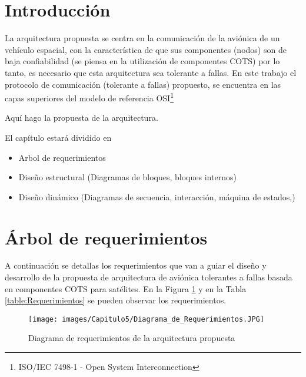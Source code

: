 \section{Introducción}

La arquitectura propuesta se centra en la comunicación de la aviónica de un
vehículo espacial, con la característica de que sus componentes (nodos) son
de baja confiabilidad (se piensa en la utilización de componentes COTS)
por lo tanto, es necesario que esta arquitectura sea tolerante a fallas. En este
trabajo el protocolo de comunicación (tolerante a fallas) propuesto,
se encuentra en las capas superiores del modelo de referencia OSI\footnote{ISO/IEC 7498-1 - Open System Interconnection}


Aquí hago la propuesta de la arquitectura.

El capítulo estará dividido en

\begin{itemize}
\item Arbol de requerimientos
\item Diseño estructural (Diagramas de bloques, bloques internos)
\item Diseño dinámico (Diagramas de secuencia, interacción, máquina de estados,)
  
\end{itemize}

\section{Árbol de requerimientos}
A continuación se detallas los requerimientos que van a guiar el diseño y
desarrollo de la propuesta de arquitectura de aviónica tolerantes a fallas
basada en componentes \ac{COTS} para satélites. En la Figura
\ref{fig:DiagramaRequerimientos} y en la Tabla \ref{table:Requerimientos} se pueden
observar los requerimientos. 

\begin{figure}[h!]
 \centering
 \texttt{[image: images/Capitulo5/Diagrama\_de\_Requerimientos.JPG]}
  \caption{Diagrama de requerimientos de la arquitectura propuesta}
\label{fig:DiagramaRequerimientos}
\end{figure} 

